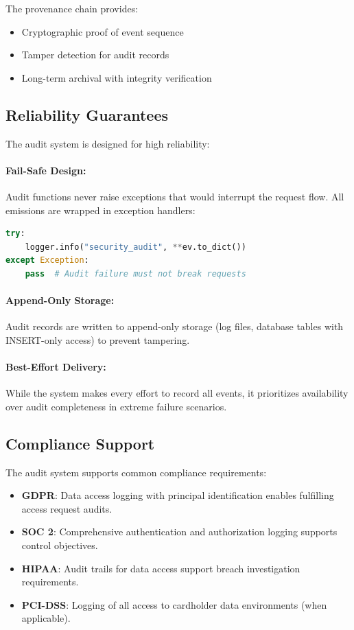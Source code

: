 The provenance chain provides:
\begin{itemize}
    \item Cryptographic proof of event sequence
    \item Tamper detection for audit records
    \item Long-term archival with integrity verification
\end{itemize}

\subsection{Reliability Guarantees}
\label{subsec:audit-reliability}

The audit system is designed for high reliability:

\paragraph{Fail-Safe Design:} Audit functions never raise exceptions that would interrupt the request flow. All emissions are wrapped in exception handlers:

\begin{lstlisting}[language=Python]
try:
    logger.info("security_audit", **ev.to_dict())
except Exception:
    pass  # Audit failure must not break requests
\end{lstlisting}

\paragraph{Append-Only Storage:} Audit records are written to append-only storage (log files, database tables with INSERT-only access) to prevent tampering.

\paragraph{Best-Effort Delivery:} While the system makes every effort to record all events, it prioritizes availability over audit completeness in extreme failure scenarios.

\subsection{Compliance Support}
\label{subsec:audit-compliance}

The audit system supports common compliance requirements:

\begin{itemize}
    \item \textbf{GDPR}: Data access logging with principal identification enables fulfilling access request audits.
    \item \textbf{SOC 2}: Comprehensive authentication and authorization logging supports control objectives.
    \item \textbf{HIPAA}: Audit trails for data access support breach investigation requirements.
    \item \textbf{PCI-DSS}: Logging of all access to cardholder data environments (when applicable).
\end{itemize}

